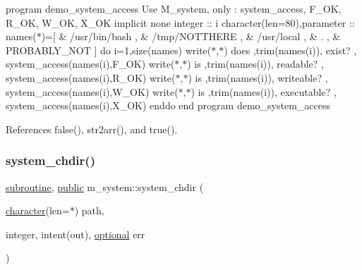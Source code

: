 program demo\+\_\+system\+\_\+access Use M\+\_\+system, only \+: system\+\_\+access, F\+\_\+\+OK, R\+\_\+\+OK, W\+\_\+\+OK, X\+\_\+\+OK implicit none integer \+:\+: i character(len=80),parameter \+:\+: names($\ast$)=\mbox{[} \& \textquotesingle{}/usr/bin/bash \textquotesingle{}, \& \textquotesingle{}/tmp/\+N\+O\+T\+T\+H\+E\+RE \textquotesingle{}, \& \textquotesingle{}/usr/local \textquotesingle{}, \& \textquotesingle{}. \textquotesingle{}, \& \textquotesingle{}P\+R\+O\+B\+A\+B\+L\+Y\+\_\+\+N\+OT \textquotesingle{}\mbox{]} do i=1,size(names) write($\ast$,$\ast$)\textquotesingle{} does \textquotesingle{},trim(names(i)),\textquotesingle{} exist? \textquotesingle{}, system\+\_\+access(names(i),\+F\+\_\+\+O\+K) write($\ast$,$\ast$)\textquotesingle{} is \textquotesingle{},trim(names(i)),\textquotesingle{} readable? \textquotesingle{}, system\+\_\+access(names(i),\+R\+\_\+\+O\+K) write($\ast$,$\ast$)\textquotesingle{} is \textquotesingle{},trim(names(i)),\textquotesingle{} writeable? \textquotesingle{}, system\+\_\+access(names(i),\+W\+\_\+\+O\+K) write($\ast$,$\ast$)\textquotesingle{} is \textquotesingle{},trim(names(i)),\textquotesingle{} executable? \textquotesingle{}, system\+\_\+access(names(i),\+X\+\_\+\+O\+K) enddo end program demo\+\_\+system\+\_\+access 

References false(), str2arr(), and true().

\mbox{\label{namespacem__system_a47746b670cb21bae0957c9bb2bccf209}} 
\subsubsection{\texorpdfstring{system\+\_\+chdir()}{system\_chdir()}}
{\footnotesize\ttfamily \hyperlink{M__stopwatch_83_8txt_acfbcff50169d691ff02d4a123ed70482}{subroutine}, \hyperlink{M__stopwatch_83_8txt_a2f74811300c361e53b430611a7d1769f}{public} m\+\_\+system\+::system\+\_\+chdir (\begin{DoxyParamCaption}\item[{\hyperlink{option__stopwatch_83_8txt_abd4b21fbbd175834027b5224bfe97e66}{character}(len=$\ast$)}]{path,  }\item[{integer, intent(out), \hyperlink{option__stopwatch_83_8txt_aa4ece75e7acf58a4843f70fe18c3ade5}{optional}}]{err }\end{DoxyParamCaption})}



